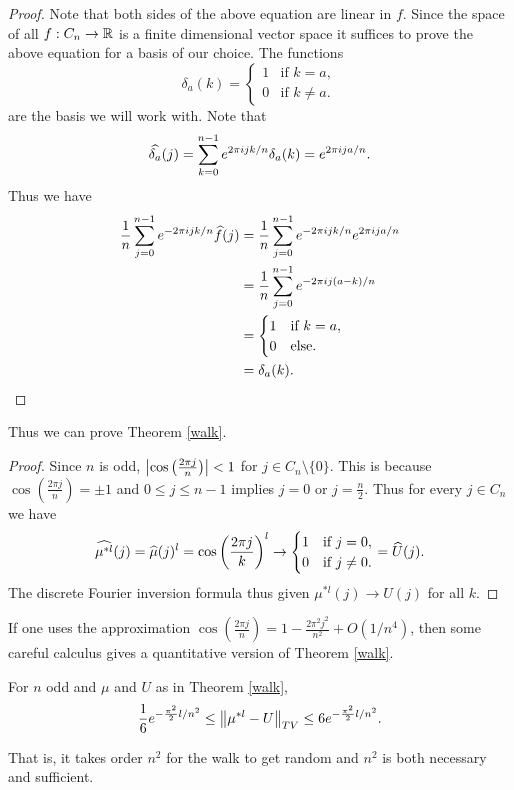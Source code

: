 \begin{proof}
    Note that both sides of the above equation are linear in $f$. Since the space of all $f:C_n \to {\mathbb R}$ is a finite dimensional vector space it suffices to prove the above equation for a basis of our choice. The functions 
    \[\delta_a(k) = \begin{cases}
        1 & \text{if } k=a,\\
        0 & \text{if } k\neq a.
    \end{cases} \]
    are the basis we will work with. Note that
    \[\widehat{\delta_a}(j) = \sum_{k=0}^{n-1} e^{2\pi i j k/n}\delta_a(k)=e^{2 \pi i j a/n}. \]
    Thus we have
    \begin{align*}
        \frac{1}{n}\sum_{j=0}^{n-1}e^{-2\pi i j k/n}\widehat{f}(j)&=\frac{1}{n}\sum_{j=0}^{n-1}e^{-2\pi i j k/n}e^{2\pi i j a/n}\\
        &=\frac{1}{n}\sum_{j=0}^{n-1}e^{-2\pi i j(a-k)/n}\\
        &=\begin{cases}
            1 & \text{if } k=a,\\
            0 & \text{else}.
        \end{cases}\\
        &=\delta_a(k).\qedhere
    \end{align*}
\end{proof}
Thus we can prove Theorem \ref{walk}.
\begin{proof}
    Since $n$ is odd, ${\left\lvert\cos\left(\frac{2\pi j}{n}\right)\right\rvert} < 1$ for $j \in C_n\setminus \{0\}$. This is because $\cos\left(\frac{2\pi j}{n}\right) = \pm1$ and $0 \le j \le n-1$ implies $j = 0$ or $j= \frac{n}{2}$.  Thus for every $j \in C_n$ we have 
    \[\widehat{\mu^{*l}}(j)=\widehat{\mu}(j)^l =\cos\left(\frac{2\pi j}{k}\right)^l\to \begin{cases}
        1 & \text{if } j=0,\\
        0 & \text{if } j\neq 0.
    \end{cases}=\widehat{U}(j). \]
    The discrete Fourier inversion formula thus given $\mu^{*l}(j) \to U(j)$ for all $k$.
\end{proof}
If one uses the approximation $\cos\left(\frac{2\pi j}{n}\right) = 1- \frac{2 \pi^2j^2}{n^2}+O(1/n^4)$, then some careful calculus gives a quantitative version of Theorem \ref{walk}.
\begin{thrm}
    For $n$ odd and $\mu$ and $U$ as in Theorem \ref{walk},
    \[\frac{1}{6}e^{-\frac{\pi^2}{2}l/n^2} \le \left\|\mu^{*l}-U\right\|_{TV} \le 6e^{-\frac{\pi^2}{2}l/n^2}. \]
\end{thrm}
That is, it takes order $n^2$ for the walk to get random and $n^2$ is both necessary and sufficient.

